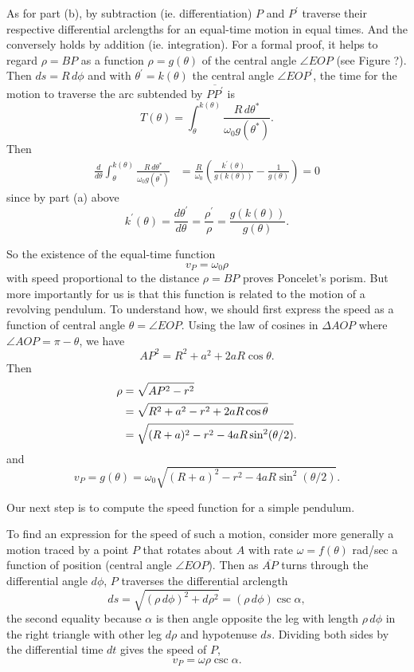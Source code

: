 \documentclass{ximera}
\begin{document}
As for part (b), by subtraction (ie. differentiation)  $P$ and $P^\prime$ traverse their respective differential arclengths for an equal-time motion in equal times. And the conversely holds by addition (ie. integration). For a formal proof, it helps to regard $\rho = BP$ as a function $\rho = g(\theta)$ of the central angle $\angle EOP$ (see Figure ?). Then $ds = R \, d\phi$ and with $\theta^\prime = k(\theta)$ the central angle $\angle EOP^\prime$, the time for the motion to traverse the arc subtended by $\overline{PP^\prime}$ is
\[
  T(\theta) =  \int_\theta^{k(\theta)} \frac{R\, d\theta^*}{\omega_0 g(\theta^*)}.
\]
Then
\begin{align*}
  \frac{d}{d\theta} \int_\theta^{k(\theta)} \frac{R\, d\theta^*}{\omega_0 g(\theta^*)} &= \frac{R}{\omega_0}\left(   \frac{k^\prime(\theta)}{g(k(\theta))} - \frac{1}{g(\theta)}        \right) = 0
\end{align*}
since by part (a) above
\[
   k^\prime(\theta) = \frac{d\theta^\prime}{d\theta} =   \frac{\rho^\prime}{\rho}   = \frac{g(k(\theta))}{g(\theta)}.
\]

So the existence of the equal-time function
\[
      v_P = \omega_0 \rho
\]
with speed proportional to the distance $\rho = BP$ proves Poncelet's porism. But more importantly for us is that this function is related to the motion of a revolving pendulum. To understand how, we should first express the speed as a function of central angle $\theta = \angle EOP$. Using the law of cosines in $\Delta AOP$ where $\angle AOP = \pi - \theta$, we have
\[
  AP^2  = R^2 + a^2 + 2aR \cos \theta .
\]
Then
\begin{align*}
   \rho  &=  \sqrt{AP^2 - r^2}         \\  \notag
          & = \sqrt{R^2 + a^2 -r^2 + 2aR \cos \theta}  \\ \notag
          &=   \sqrt{(R+a)^2 - r^2 - 4aR\sin^2 (\theta/2)} .
\end{align*}
and
\begin{equation}
      v_P = g(\theta) = \omega_0  \sqrt{(R+a)^2 - r^2 - 4aR\sin^2 (\theta/2)}.  \label{Eq:PropSpeed}
\end{equation}

Our next step is to compute the speed function for a simple pendulum.








\iffalse
To find an expression for the speed of such a motion, consider more generally a motion traced by a point $P$ that rotates about $A$ with rate $\omega = f(\theta)$ rad/sec a function of position (central angle $\angle EOP$). Then as $\overline{AP}$ turns through the differential angle $d\phi$, $P$ traverses the differential arclength
\[
   ds =  \sqrt{(\rho \, d\phi)^2 + d\rho^2}   =   (\rho \, d\phi) \csc \alpha ,
\]
the second equality because $\alpha$ is then angle opposite the leg with length $\rho \, d\phi$ in the right triangle with other leg $d\rho$ and hypotenuse $ds$. Dividing both sides by the differential time $dt$ gives the speed of $P$,
\[
     v_P  = \omega \rho \csc \alpha .
\]
\end{document}
